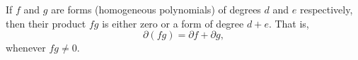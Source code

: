 If $f$ and $g$ are forms (homogeneous polynomials) of degrees $d$ and $e$ respectively, then their product $fg$ is either zero or a form of degree $d + e$. That is,
$$\partial(fg) = \partial f + \partial g,$$
whenever $fg \neq 0$.
